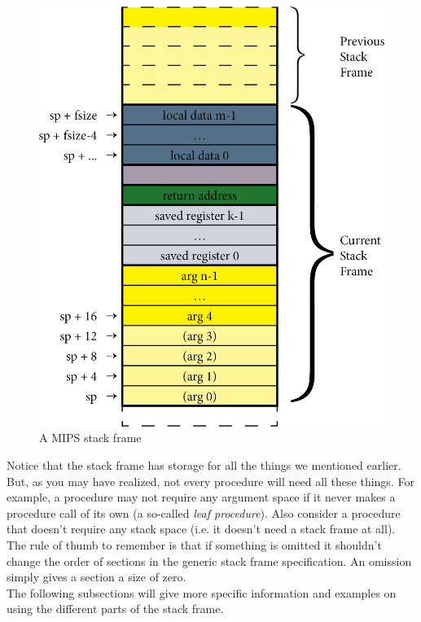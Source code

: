 \documentclass[12pt]{article}
\begin{document}
\newpage
\begin{figure}
\centering
\includegraphics{stack-frame.png}
\caption{A MIPS stack frame}
\label{fig:stackframe}
\end{figure}

Notice that the stack frame has storage for all the things we mentioned
     earlier. But, as you may have realized, not every procedure will need all
     these things. For example, a procedure may not require any argument space
     if it never makes a procedure call of its own (a so-called \textit{leaf
     procedure}). Also consider a procedure that doesn't require any stack space
     (i.e. it doesn't need a stack frame at all). The rule of thumb to remember
     is that if something is omitted it shouldn't change the order of sections
     in the generic stack frame specification. An omission simply gives a
     section a size of zero.\\

The following subsections will give more specific information and examples on
     using the different parts of the stack frame.\\
\end{document}
